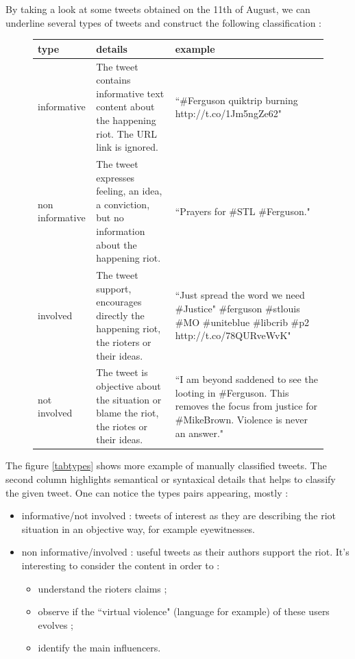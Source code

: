 \documentclass[a4paper,twoside,12pt,openright]{report}
\begin{document}
\newcommand{\info}[1]{\colorbox{cyan!20}{#1}}
\newcommand{\rass}[1]{\colorbox{red!20}{#1}}
\newcommand{\ninfo}[1]{\colorbox{black!20}{#1}}
\newcommand{\nrass}[1]{\colorbox{green!20}{#1}}

By taking a look at some tweets obtained on the 11th of August, we can underline several types of tweets and construct the following classification :

\begin{figure}[h!]
\centering
\begin{tabular}{l|m{7cm}|m{6cm}}
type & details & example\\
\hline
\hline
\info{informative} & The tweet contains informative text content about the happening riot. The URL link is ignored. & ``\#Ferguson quiktrip burning http://t.co/1Jm5ngZe62" \\
\hline
\ninfo{non informative} & The tweet expresses feeling, an idea, a conviction, but no information about the happening riot. & ``Prayers for \#STL \#Ferguson." \\
\hline
\hline
\rass{involved} & The tweet support, encourages directly the happening riot, the rioters or their ideas. & ``Just spread the word we need \#Justice" \#ferguson \#stlouis \#MO  \#uniteblue \#libcrib \#p2 http://t.co/78QURveWvK" \\
\hline
\nrass{not involved} & The tweet is objective about the situation or blame the riot, the riotes or their ideas. & ``I am beyond saddened to see the looting in \#Ferguson. This removes the focus from justice for \#MikeBrown. Violence is never an answer." \\
\end{tabular}
\end{figure}

The figure \ref{tabtypes} shows more example of manually classified tweets. The second column highlights semantical or syntaxical details that helps to classify the given tweet.
One can notice the types pairs appearing, mostly :

\begin{itemize}
\item \info{informative}/\nrass{not involved} : tweets of interest as they are describing the riot situation in an objective way, for example eyewitnesses.
\item \ninfo{non informative}/\rass{involved} : useful tweets as their authors support the riot. It's interesting to consider the content in order to :
\begin{itemize}
\item understand the rioters claims ;
\item observe if the ``virtual violence" (language for example) of these users evolves ;
\item identify the main influencers.
\end{itemize}
\end{itemize}
\end{document}
